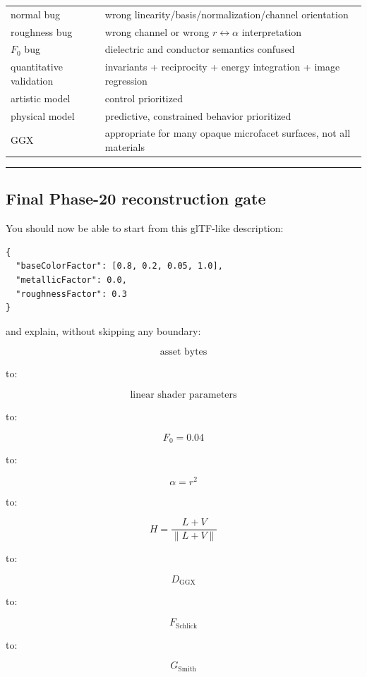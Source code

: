 {\begin{longtable}[]{@{}
  >{\raggedright\arraybackslash}p{}
  >{\raggedright\arraybackslash}p{}@{}}
normal bug & wrong linearity/basis/normalization/channel orientation \\
roughness bug & wrong channel or wrong \(r\leftrightarrow\alpha\) interpretation \\
\(F_0\) bug & dielectric and conductor semantics confused \\
quantitative validation & invariants + reciprocity + energy integration + image regression \\
artistic model & control prioritized \\
physical model & predictive, constrained behavior prioritized \\
GGX & appropriate for many opaque microfacet surfaces, not all materials \\
\end{longtable}
}

\begin{center}\rule{0.5\linewidth}{0.5pt}\end{center}

\subsection{Final Phase-20 reconstruction gate}\label{03-visual-computing-i-ch006-final-phase-20-reconstruction-gate}

You should now be able to start from this glTF-like description:

\begin{verbatim}
{
  "baseColorFactor": [0.8, 0.2, 0.05, 1.0],
  "metallicFactor": 0.0,
  "roughnessFactor": 0.3
}
\end{verbatim}

and explain, without skipping any boundary:

\[
\text{asset bytes}
\]

to:

\[
\text{linear shader parameters}
\]

to:

\[
F_0=0.04
\]

to:

\[
\alpha=r^2
\]

to:

\[
H=\frac{L+V}{\|L+V\|}
\]

to:

\[
D_{\mathrm{GGX}}
\]

to:

\[
F_{\mathrm{Schlick}}
\]

to:

\[
G_{\mathrm{Smith}}
\]

